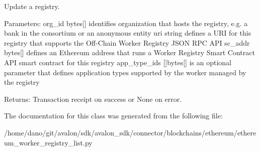 \begin{DoxyVerb}Update a registry.

Parameters:
org_id               bytes[] identifies organization that hosts the
             registry, e.g. a bank in the consortium or
             an anonymous entity
uri                  string defines a URI for this registry that
             supports the Off-Chain Worker Registry
             JSON RPC API
sc_addr              bytes[] defines an Ethereum address that
             runs a Worker Registry Smart Contract API
             smart contract for this registry
app_type_ids         []bytes[] is an optional parameter that defines
             application types supported by the worker
             managed by the registry

Returns:
Transaction receipt on success or None on error.
\end{DoxyVerb}
 

The documentation for this class was generated from the following file\+:\begin{DoxyCompactItemize}
\item 
/home/dano/git/avalon/sdk/avalon\+\_\+sdk/connector/blockchains/ethereum/ethereum\+\_\+worker\+\_\+registry\+\_\+list.\+py\end{DoxyCompactItemize}

